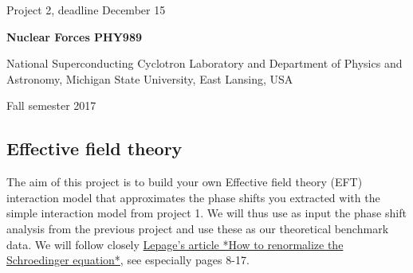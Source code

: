 \documentclass[%
oneside,                 %
final,                   %
10pt]{article}
\begin{document}

\newcommand{\exercisesection}[1]{\subsection*{#1}}






\thispagestyle{empty}

\begin{center}
{\LARGE\bf
\begin{spacing}{1.25}
Project 2, deadline  December 15
\end{spacing}
}
\end{center}


\begin{center}
{\bf Nuclear Forces PHY989}
\end{center}

    \begin{center}
\centerline{{\small National Superconducting Cyclotron Laboratory and Department of Physics and Astronomy, Michigan State University, East Lansing, USA}}
\end{center}
    

\begin{center}
Fall semester 2017
\end{center}

\vspace{1cm}


\subsection*{Effective field theory}

The aim of this project is to build your own Effective field theory
(EFT) interaction model that approximates the phase shifts you
extracted with the simple interaction model from project 1. We will
thus use as input the phase shift analysis from the previous project
and use these as our theoretical benchmark data.  We will follow closely
\href{{https://arxiv.org/abs/nucl-th/9706029}}{Lepage's article *How to renormalize the Schroedinger
equation*}, see especially
pages 8-17.
\end{document}

